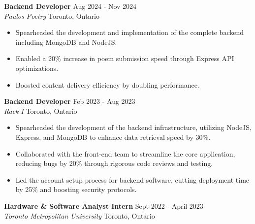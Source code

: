 \documentclass[letterpaper]{article} %
\begin{document}
\textbf{Backend Developer} \hfill Aug 2024 - Nov 2024\\
\textit{Paulos Poetry} \hfill Toronto, Ontario\\
\vspace{-1mm}
\begin{itemize} \itemsep 1pt
    \item Spearheaded the development and implementation of the complete backend including MongoDB and NodeJS.
    \item Enabled a 20\% increase in poem submission speed through Express API optimizations.
    \item Boosted content delivery efficiency by doubling performance.
\end{itemize}
\textbf{Backend Developer} \hfill Feb 2023 - Aug 2023\\
\textit{Rack-I} \hfill Toronto, Ontario\\
\vspace{-1mm}
\begin{itemize} \itemsep 1pt
    \item Spearheaded the development of the backend infrastructure, utilizing NodeJS, Express, and MongoDB to enhance data retrieval speed by 30\%.
    \item Collaborated with the front-end team to streamline the core application, reducing bugs by 20\% through rigorous code reviews and testing.
    \item Led the account setup process for backend software, cutting deployment time by 25\% and boosting security protocols.
\end{itemize}
\textbf{Hardware \& Software Analyst Intern} \hfill Sept 2022 - April 2023\\
\textit{Toronto Metropolitan University} \hfill Toronto, Ontario\\
\end{document}
